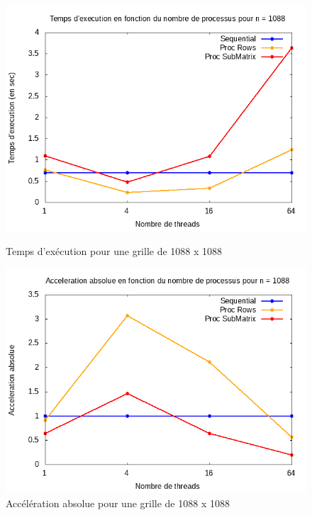 \documentclass[10pt,a4paper]{article}
\begin{document}
\begin{figure}[h]
  \centering
  \begin{minipage}[b]{0.49\textwidth}
	\includegraphics[width=\textwidth]{./Time/size_1088_time.png}
    \caption{Temps d'exécution pour une grille de 1088 x 1088}
  \end{minipage}
  \hfill
  \begin{minipage}[b]{0.49\textwidth}
    \includegraphics[width=\textwidth]{./Time/size_1088_acceleration.png}
    \caption{Accélération absolue pour une grille de 1088 x 1088}
  \end{minipage}
\end{figure}

\newpage
\end{document}
